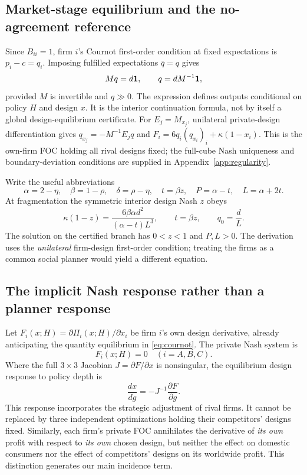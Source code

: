 \documentclass[11pt,a4paper]{article}
\theoremstyle{remark}\newtheorem{remark}[theorem]{Remark}
\begin{document}
\subsection{Market-stage equilibrium and the no-agreement reference}
Since $B_{ii}=1$, firm $i$'s Cournot first-order condition at fixed expectations is $p_i-c=q_i$. Imposing fulfilled expectations $\bar q=q$ gives
\begin{equation}\label{eq:cournot}
M q=d\boldsymbol{1},\qquad q=d M^{-1}\boldsymbol{1},
\end{equation}
provided $M$ is invertible and $q\gg0$. The expression defines outputs conditional on policy $H$ and design $x$. It is the interior continuation formula, not by itself a global design-equilibrium certificate. For $E_j=M_{x_j}$, unilateral private-design differentiation gives $q_{x_j}=-M^{-1}E_jq$ and $F_i=6q_i(q_{x_i})_i+\kappa(1-x_i)$. This is the own-firm FOC holding all rival designs fixed; the full-cube Nash uniqueness and boundary-deviation conditions are supplied in Appendix~\ref{app:regularity}.

Write the useful abbreviations
\begin{equation}\label{eq:abbrev}
\alpha=2-\eta,\quad\beta=1-\rho,\quad\delta=\rho-\eta,\quad
t=\beta z,\quad P=\alpha-t,\quad L=\alpha+2t.
\end{equation}
At fragmentation the symmetric interior design Nash $z$ obeys
\begin{equation}\label{eq:root}
\kappa(1-z)=\frac{6\beta\alpha d^2}{(\alpha-t)L^3},\qquad t=\beta z,\qquad q_0=\frac dL.
\end{equation}
The solution on the certified branch has $0<z<1$ and $P,L>0$. The derivation uses the \emph{unilateral} firm-design first-order condition; treating the firms as a common social planner would yield a different equation.

\subsection{The implicit Nash response rather than a planner response}
Let $F_i(x;H)=\partial\Pi_i(x;H)/\partial x_i$ be firm $i$'s own design derivative, already anticipating the quantity equilibrium in \eqref{eq:cournot}. The private Nash system is
\begin{equation}\label{eq:designFOC}
F_i(x;H)=0\quad (i=A,B,C).
\end{equation}
Where the full $3\times3$ Jacobian $J=\partial F/\partial x$ is nonsingular, the equilibrium design response to policy depth is
\begin{equation}\label{eq:implicit}
\frac{dx}{dg}=-J^{-1}\frac{\partial F}{\partial g}.
\end{equation}
This response incorporates the strategic adjustment of rival firms. It cannot be replaced by three independent optimizations holding their competitors' designs fixed. Similarly, each firm's private FOC annihilates the derivative of \emph{its own} profit with respect to \emph{its own} chosen design, but neither the effect on domestic consumers nor the effect of competitors' designs on its worldwide profit. This distinction generates our main incidence term.
\end{document}
